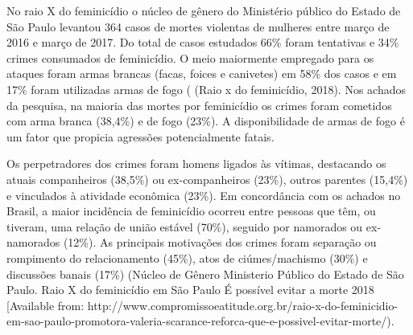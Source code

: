 No raio X do feminicídio o núcleo de gênero do Ministério público do Estado de São Paulo levantou 364 casos de mortes violentas de mulheres entre março de 2016 e março de 2017. Do total de casos estudados 66\% foram tentativas e 34\% crimes consumados de feminicídio. O meio maiormente empregado para os ataques foram armas brancas (facas, foices e canivetes) em 58\% dos casos e em 17\% foram utilizadas armas de fogo ( (Raio x do feminicídio, 2018). Nos achados da pesquisa, na maioria das mortes por feminicídio os crimes foram cometidos com arma branca (38,4\%) e de fogo (23\%).  A disponibilidade de armas de fogo é um fator que propicia agressões potencialmente fatais.

Os perpetradores dos crimes foram homens ligados às vítimas, destacando os atuais companheiros (38,5\%) ou ex-companheiros (23\%), outros parentes (15,4\%) e vinculados à atividade econômica (23\%). Em concordância com os achados no Brasil, a maior incidência de feminicídio ocorreu entre pessoas que têm, ou tiveram, uma relação de união estável (70\%), seguido por namorados ou ex-namorados (12\%). As principais motivações dos crimes foram separação ou rompimento do relacionamento (45\%), atos de ciúmes/machismo (30\%) e discussões banais (17\%) (Núcleo de Gênero Ministerio Público do Estado de São Paulo. Raio X do feminicídio em São Paulo  É possível evitar a morte   2018 [Available from: http://www.compromissoeatitude.org.br/raio-x-do-feminicidio-em-sao-paulo-promotora-valeria-scarance-reforca-que-e-possivel-evitar-morte/). 

